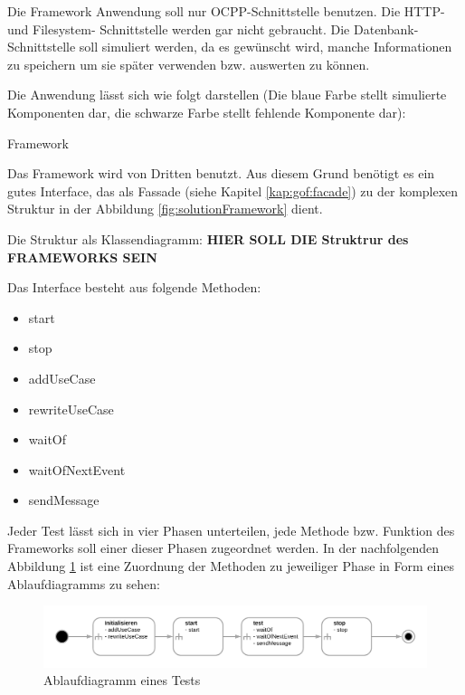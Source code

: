 Die Framework Anwendung soll nur OCPP-Schnittstelle benutzen. 
Die HTTP- und Filesystem- Schnittstelle werden gar nicht gebraucht.
Die Datenbank-Schnittstelle soll simuliert werden, da es gewünscht wird, 
manche Informationen zu speichern um sie später verwenden bzw. auswerten zu können.

Die Anwendung lässt sich wie folgt darstellen 
(Die blaue Farbe stellt simulierte Komponenten dar, die schwarze Farbe stellt fehlende Komponente dar):

{Framework}

\newpage
Das Framework wird von Dritten benutzt. Aus diesem Grund benötigt es ein gutes Interface, 
das als Fassade (siehe Kapitel \ref{kap:gof:facade}) 
zu der komplexen Struktur in der Abbildung \ref{fig:solutionFramework} dient.

Die Struktur als Klassendiagramm:
\textbf{HIER SOLL DIE Struktrur des FRAMEWORKS SEIN}

Das Interface besteht aus folgende Methoden:
\begin{itemize}
    \item start
    \item stop
    \item addUseCase
    \item rewriteUseCase
    \item waitOf
    \item waitOfNextEvent
    \item sendMessage
\end{itemize}

Jeder Test lässt sich in vier Phasen unterteilen, jede Methode bzw. 
Funktion des Frameworks soll einer dieser Phasen zugeordnet werden.
In der nachfolgenden Abbildung \ref{fig:TestFlow} 
ist eine Zuordnung der Methoden zu jeweiliger Phase in Form eines Ablaufdiagramms zu sehen:

\begin{figure}[H]
    \centering
    \includegraphics[width=1\textwidth]{./images/TestAblauf.png}
    \caption[Ablaufdiagramm eines Tests]{Ablaufdiagramm eines Tests}
    \label{fig:TestFlow}
\end{figure}
